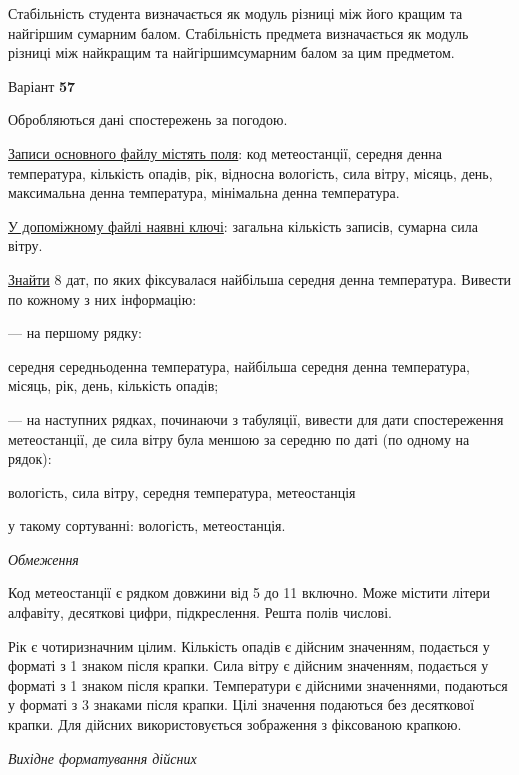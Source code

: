 \documentclass[11pt, ukrainian]{article}
\begin{document}
Стабільність студента визначається як модуль різниці між його кращим та найгіршим сумарним балом.
Стабільність предмета визначається як модуль різниці між найкращим та найгіршимсумарним балом за цим предметом.






\par
\newpage
{\center Варіант  \No \textbf { 57 }\par}
\bigskip
Обробляються дані спостережень за погодою. 

\underline{Записи основного файлу містять поля}: код метеостанції, середня денна температура, кількість опадів, рік, відносна вологість, сила вітру, місяць, день, максимальна денна температура, мінімальна денна температура.

\underline{У допоміжному файлі наявні ключі}: загальна кількість записів, сумарна сила вітру.

\underline{Знайти} 8 дат, по яких фіксувалася найбільша середня денна температура. Вивести по кожному з них інформацію:\par
{\noindent}--- на першому рядку:\par
середня середньоденна температура, найбільша середня денна температура, місяць, рік, день, кількість опадів;

{\noindent}--- на наступних рядках, починаючи з табуляції, вивести для дати спостереження метеостанції, де сила вітру була меншою за середню по даті (по одному на рядок):\par
вологість, сила вітру, середня температура, метеостанція

{\noindent}у такому сортуванні: вологість, метеостанція.


\bigskip\textit{Обмеження}

Код метеостанції є рядком довжини від 5 до 11 включно.
Може містити літери алфавіту, десяткові цифри, підкреслення. Решта полів числові.

Рік є чотиризначним цілим.
Кількість опадів є дійсним значенням, подається у форматі з 1 знаком після крапки.
Сила вітру є дійсним значенням, подається у форматі з 1 знаком після крапки.
Температури є дійсними значеннями, подаються у форматі з 3 знаками після крапки.
Цілі значення подаються без десяткової крапки.
Для дійсних використовується зображення з фіксованою крапкою.

\textit{Вихідне форматування дійсних}
\end{document}
